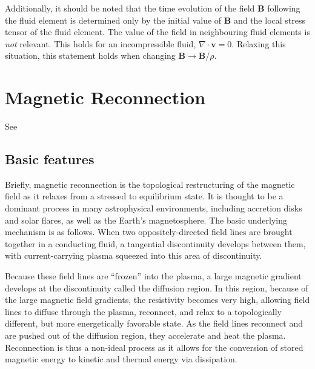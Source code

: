 	Additionally, it should be noted that the time evolution of the field $\mathbf{B}$ following the fluid element is determined only by the initial value of $\mathbf{B}$ and the local stress tensor of the fluid element. The value of the field in neighbouring fluid elements is \textit{not} relevant. This holds for an incompressible fluid, $\nabla\cdot\mathbf{v}=0$. Relaxing this situation, this statement holds when changing $\mathbf{B}\to\mathbf{B}/\rho$. 

\section{Magnetic Reconnection}
See \cite{priest_magnetic_2000}

	\subsection{Basic features}
	Briefly, magnetic reconnection is the topological restructuring of the magnetic field as it relaxes from a stressed to equilibrium state. It is thought to be a dominant process in many astrophysical environments, including accretion disks and solar flares, as well as the Earth's magnetosphere. The basic underlying mechanism is as follows. When two oppositely-directed field lines are brought together in a conducting fluid, a tangential discontinuity develops between them, with current-carrying plasma squeezed into this area of discontinuity.

	Because these field lines are ``frozen'' into the plasma, a large magnetic gradient develops at the discontinuity called the diffusion region. In this region, because of the large magnetic field gradients, the resistivity becomes very high, allowing field lines to diffuse through the plasma, reconnect, and relax to a topologically different, but more energetically favorable state. As the field lines reconnect and are pushed out of the diffusion region, they accelerate and heat the plasma. Reconnection is thus a non-ideal process as it allows for the conversion of stored magnetic energy to kinetic and thermal energy via dissipation.

